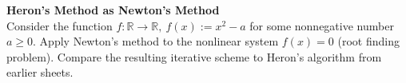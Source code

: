 \textbf{Heron's Method as Newton's Method}\\
Consider the function $f\colon \mathbb{R}\to\mathbb{R},~f(x):= x^2 -a$ for some nonnegative number $a\geq 0$.  Apply Newton's method to the nonlinear system $f(x)=0$ (root finding problem). Compare the resulting iterative scheme to Heron's algorithm from earlier sheets.
